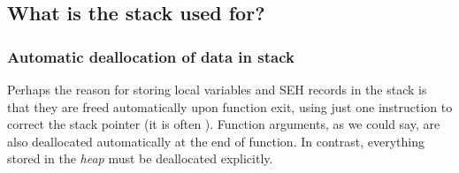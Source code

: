 \subsection{What is the stack used for?}








\subsubsection{Automatic deallocation of data in stack}

Perhaps the reason for storing local variables and SEH records in the stack is that they are freed automatically upon function exit,
using just one instruction to correct the stack pointer (it is often \ADD).
Function arguments, as we could say, are also deallocated automatically at the end of function.
In contrast, everything stored in the \emph{heap} must be deallocated explicitly.




